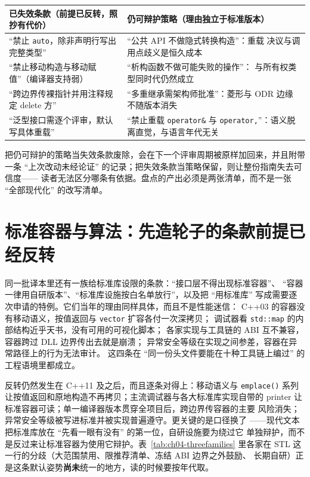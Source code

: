 \documentclass[12pt,a4paper,fontset=fandol]{ctexbook}
\newcommand{\cpp}[1]{C++#1}
\newcommand{\Fn}[1]{\texttt{#1()}}
\newcommand{\Tp}[1]{\texttt{#1}}
\begin{document}
\begin{compare}[title={已失效条款 vs 仍可辩护策略}]
\begin{tabularx}{\linewidth}{>{\raggedright\arraybackslash}X >{\raggedright\arraybackslash}X}
\toprule
已失效条款（前提已反转，照抄有代价） & 仍可辩护策略（理由独立于标准版本） \\
\midrule
``禁止 \Tp{auto}，除非声明行写出完整类型'' & ``公共 API 不做隐式转换构造''：重载
决议与调用点歧义是恒久成本 \\
``禁止移动构造与移动赋值''（编译器支持弱） & ``析构函数不做可能失败的操作''：
与所有权类型同时代仍然成立 \\
``跨边界传裸指针并用注释规定 delete 方'' & ``多重继承需架构师批准''：菱形与
ODR 边缘不随版本消失 \\
``泛型接口需逐个评审，默认写具体重载'' & ``禁止重载 \Tp{operator\&} 与
\Tp{operator,}''：语义脱离直觉，与语言年代无关 \\
\bottomrule
\end{tabularx}
\end{compare}

\begin{note}[title={为什么两类条目要分开处理}]
把仍可辩护的策略当失效条款废除，会在下一个评审周期被原样加回来，并且附带一条
``上次改动未经论证'' 的记录；把失效条款当策略保留，则让整份指南失去可信度——
读者无法区分哪条有依据。盘点的产出必须是两张清单，而不是一张 ``全部现代化''
的改写清单。
\end{note}

\section{标准容器与算法：先造轮子的条款前提已经反转}
\label{sec:ch12-stl}

同一批译本里还有一族给标准库设限的条款：``接口层不得出现标准容器''、
``容器一律用自研版本''、``标准库设施按白名单放行''，以及把 ``用标准库''
写成需要逐次申请的特例。它们当年的理由同样具体，而且不是性能迷信：
\cpp{03} 的容器没有移动语义，按值返回与 \Tp{vector} 扩容各付一次深拷贝；
调试器看 \Tp{std::map} 的内部结构近乎天书，没有可用的可视化脚本；
各家实现与工具链的 ABI 互不兼容，容器跨过 DLL 边界传出去就是崩溃；
异常安全等级在实现之间参差，容器在异常路径上的行为无法审计。
这四条在 ``同一份头文件要能在十种工具链上编过'' 的工程语境里都成立。

反转仍然发生在 \cpp{11} 及之后，而且逐条对得上：移动语义与 \Fn{emplace}
系列让按值返回和原地构造不再拷贝；主流调试器与各大标准库实现自带的
printer 让标准容器可读；单一编译器版本贯穿全项目后，跨边界传容器的主要
风险消失；异常安全等级被写进标准并被实现普遍遵守。更关键的是口径换了
——现代文本把标准库放在 ``先看一眼有没有'' 的第一位，自研设施要为绕过它
单独辩护，而不是反过来让标准容器为使用它辩护。表~\ref{tab:ch04-threefamilies}
里各家在 STL 这一行的分歧（大范围禁用、限推荐清单、冻结 ABI 边界之外鼓励、
长期自研）正是这条默认姿势\textbf{尚未}统一的地方，读的时候要按年代取。
\end{document}
